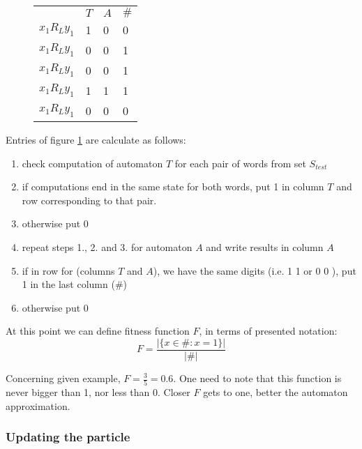 \documentclass[runningheads,a4paper]{llncs}
\begin{document}
\begin{figure}[H]
\begin{center}
\begin{tabular}{ m{4.5em}  m{3em}  m{3em}  m{3em} }
                 & $T$ & $A$ & $\#$ \\  
 $x_1 R_{L} y_1$ & 1 & 0 & 0 \\   
 $x_1 R_{L} y_1$ & 0 & 0 & 1 \\   
 $x_1 R_{L} y_1$ & 0 & 0 & 1 \\   
 $x_1 R_{L} y_1$ & 1 & 1 & 1 \\   
 $x_1 R_{L} y_1$ & 0 & 0 & 0 \\   
\end{tabular}
\caption{}
\label{fig:fitness_table}
\end{center}
\end{figure}

Entries of figure \ref{fig:fitness_table} are calculate as follows:
\begin{enumerate}
\item check computation of automaton $T$ for each pair of words from set $S_{test}$
\item if computations end in the same state for both words, put 1 in column $T$ and row corresponding to that pair.
\item otherwise put 0
\item repeat steps 1., 2. and 3. for automaton $A$ and write results in column $A$
\item if in row for (columns $T$ and $A$), we have the same digits (i.e. 1 1 or 0 0 ), put 1 in the last column ($\#$)
\item otherwise put 0
\end{enumerate}

At this point we can define fitness function $F$, in terms of presented notation:
\[
	F = \frac{|\{x \in \# : x = 1 \}|}{|\#|}
\]

Concerning given example, $F = \frac{3}{5} = 0.6$. One need to note that this function is never bigger than 1, nor less than 0. Closer $F$ gets to one, better the automaton approximation. 
\subsubsection{Updating the particle}
\end{document}
